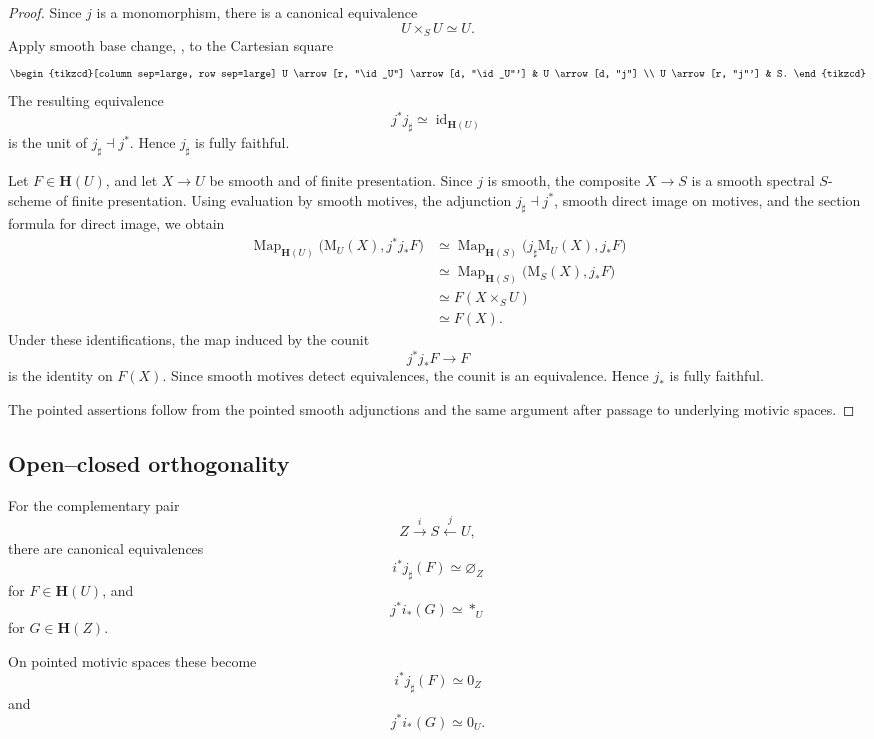 \begin{proof}
Since \(j\) is a monomorphism, there is a canonical equivalence
\[
    U\times_SU
    \simeq
    U.
\]
Apply smooth base change,
,
to the Cartesian square
\[
\begin{tikzcd}[column sep=large, row sep=large]
    U
        \arrow[r, "\id_U"]
        \arrow[d, "\id_U"']
    &
    U
        \arrow[d, "j"]
    \\
    U
        \arrow[r, "j"']
    &
    S.
\end{tikzcd}
\]
The resulting equivalence
\[
    j^*j_\sharp
    \simeq
    \operatorname{id}_{\mathbf H(U)}
\]
is the unit of \(j_\sharp\dashv j^*\).  Hence \(j_\sharp\) is fully
faithful.

Let \(F\in\mathbf H(U)\), and let \(X\to U\) be smooth and of finite
presentation.  Since \(j\) is smooth, the composite \(X\to S\) is a
smooth spectral \(S\)-scheme of finite presentation.  Using evaluation
by smooth motives, the adjunction \(j_\sharp\dashv j^*\), smooth direct
image on motives, and the section formula for direct image, we obtain
\[
\begin{aligned}
    \operatorname{Map}_{\mathbf H(U)}
    \bigl(
        \mathrm M_U(X),
        j^*j_*F
    \bigr)
    &\simeq
    \operatorname{Map}_{\mathbf H(S)}
    \bigl(
        j_\sharp\mathrm M_U(X),
        j_*F
    \bigr)
    \\
    &\simeq
    \operatorname{Map}_{\mathbf H(S)}
    \bigl(
        \mathrm M_S(X),
        j_*F
    \bigr)
    \\
    &\simeq
    F(X\times_SU)
    \\
    &\simeq
    F(X).
\end{aligned}
\]
Under these identifications, the map induced by the counit
\[
    j^*j_*F
    \longrightarrow
    F
\]
is the identity on \(F(X)\).  Since smooth motives detect equivalences,
the counit is an equivalence.  Hence \(j_*\) is fully faithful.

The pointed assertions follow from the pointed smooth adjunctions and
the same argument after passage to underlying motivic spaces.
\end{proof}

\subsection{Open--closed orthogonality}

\begin{proposition}
\label{prop:open-closed-orthogonality}
For the complementary pair
\[
    Z
    \xrightarrow{i}
    S
    \xleftarrow{j}
    U,
\]
there are canonical equivalences
\[
    i^*j_\sharp(F)
    \simeq
    \varnothing_Z
\]
for \(F\in\mathbf H(U)\), and
\[
    j^*i_*(G)
    \simeq
    *_U
\]
for \(G\in\mathbf H(Z)\).

On pointed motivic spaces these become
\[
    i^*j_\sharp(F)
    \simeq
    0_Z
\]
and
\[
    j^*i_*(G)
    \simeq
    0_U.
\]
\end{proposition}

